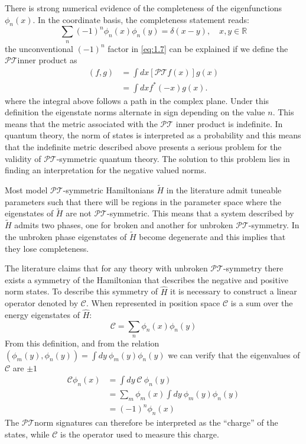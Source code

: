 \documentclass[12pt, a4paper]{report}
\newcommand\PT{\(\mathcal{PT}\)}
\newcommand\CC{\(\mathcal{C}\)}
\begin{document}
There is strong numerical evidence of the completeness of the eigenfunctions $\phi_n(x)$\cite{ComplexExtension}\cite{Bender_2004}\cite{Brody_2013}. In the coordinate basis, the completeness statement reads:
\begin{equation}\label{eq:1.7}
\sum_{n}(-1)^{n}\phi_n(x)\phi_n(y) = \delta(x-y),\quad x, y \in \mathbb{R}
\end{equation}
the unconventional $(-1)^n$ factor in \ref{eq:1.7} can be explained if we define the \PT\:inner product as
\begin{align}\label{eq:1.8}
\left ( f, g \right )  & = \int dx \left [ \mathcal{PT} f(x) \right ] g(x)\nonumber\\
                       & = \int dx f^{*}(-x) g(x).
\end{align}
where the integral above follows a path in the complex plane. Under this definition the eigenstate norms alternate in sign depending on the value $n$. This means that the metric associated with the \PT\: inner product is indefinite\cite{Bender_2004}\cite{Critique}.
In quantum theory, the norm of states is interpreted as a probability and this means that the indefinite metric described above presents a serious problem for the validity of \PT-symmetric quantum theory. The solution to this problem lies in finding an interpretation for the negative valued norms\cite{PTsymmetricQM}.

Most model \PT-symmetric Hamiltonians $\tilde{H}$ in the literature admit tuneable parameters such that there will be regions in the parameter space where the eigenstates of $\tilde{H}$ are not \PT-symmetric\cite{Brody_2013}. This means that a system described by $\tilde{H}$ admits two phases, one for broken and another for unbroken \PT-symmetry. In the unbroken phase eigenstates of $\tilde{H}$ become degenerate and this implies that they lose completeness\cite{Brody_2013}. 

The literature claims that for any theory with unbroken \PT-symmetry there exists a symmetry of the Hamiltonian that describes the negative and positive norm states. To describe this symmetry of $\hat{H}$ it is necessary to construct a linear operator denoted by \CC\cite{MustaHbeHermitian}\cite{ComplexExtension}\cite{Bender_2004}. When represented in position space \CC\: is a sum over the energy eigenstates of $\hat{H}$:
\begin{equation}\label{eq:1.9}
\mathcal{C} = \sum_n \phi_n(x)\phi_n(y)
\end{equation}
From this definition, and from the relation $(\phi_m(y), \phi_n(y)) = \int dy\:\phi_m(y)\phi_n(y)$ we can verify that the eigenvalues of \CC\: are $\pm 1$
\begin{align}\label{eq:1.10}
\mathcal{C} \phi_n(x) & = \int dy\:\mathcal{C}\:\phi_n(y)\nonumber \\
& = \sum_{m}\phi_m(x)\int dy\:\phi_m(y) \phi_n(y)\nonumber \\
& = (-1)^n \phi_n(x)
\end{align}
The \PT\:norm signatures can therefore be interpreted as the ``charge'' of the states, while \CC\: is the operator used to measure this charge\cite{Bender_2004}.
\end{document}

